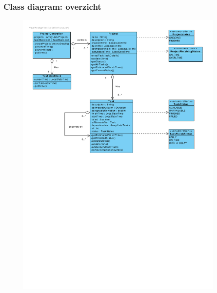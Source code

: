\documentclass{beamer}
\begin{document}
%
%
%

\begin{frame}
\frametitle {Class diagram: overzicht}
\begin{figure}
\centering
\begin{center}
\includegraphics[width=0.92\textwidth]{figures/ClassDiagram.pdf}
\end{center}

\end{figure}
\end{frame}
\end{document}
